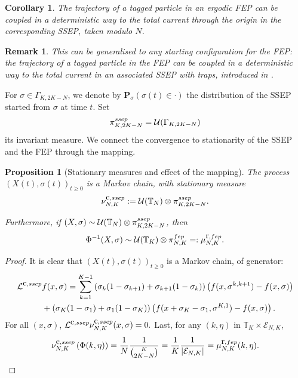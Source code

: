 \documentclass[11pt,a4paper]{article}
\newcommand{\T}{\mathbb{T}}
\newcommand{\bP}{\textbf{P}}
\newcommand{\FEP}{\textsc{fep}}
\newcommand{\SSEP}{\textsc{ssep}}
\newtheorem{proposition}[theorem]{Proposition}
\newtheorem{corollary}[theorem]{Corollary}
\newtheorem{remark}{Remark}[section]
\newcommand{\eqs}[1]{\begin{equation}#1\end{equation}}
\begin{document}
\begin{corollary} \label{cor:mapc}
The trajectory of a tagged particle in an ergodic FEP can be coupled in a deterministic way to the total current through the origin in the corresponding SSEP, taken modulo $N$. 
\end{corollary}

\begin{remark}
This can be generalised to any starting configuration for the FEP: the trajectory of a tagged particle in the FEP can be coupled in a deterministic way to the total current in an associated SSEP with traps, introduced in \cite{erignoux_cutoff_2024}.
\end{remark}

For $\sigma \in \Gamma_{K,2K-N}$, we denote by $\bP_\sigma(\sigma(t) \in \cdot)$ the distribution of the SSEP started from $\sigma$ at time $t$. Set
\eqs{\pi_{K,2K-N}^{\SSEP} = \mathcal{U}(\Gamma_{K, 2K-N})}
its invariant measure. We connect the convergence to stationarity of the SSEP and the FEP through the mapping.
\begin{proposition}[Stationary measures and effect of the mapping] \label{prop:stat_meas_map}
The process $(X(t), \sigma(t))_{t\ge 0}$ is a Markov chain, with stationary measure
\eqs{\nu_{N,K}^{\hbox{\tiny c},\SSEP} := \mathcal{U}(\T_N) \otimes \pi^{\SSEP}_{K,2K-N}.} 

Furthermore, if $(X, \sigma) \sim \mathcal{U}(\T_N) \otimes \pi^{\SSEP}_{K,2K-N}$, then 
\eqs{\Phi^{-1}(X,\sigma) \sim \mathcal{U}(\T_K) \otimes \pi^{\FEP}_{N,K} =: \mu_{N,K}^{\hbox{\tiny r},\FEP}.}
\end{proposition}
\begin{proof}
It is clear that $(X(t), \sigma(t))_{t\ge 0}$ is a Markov chain, of generator:
\begin{align}
\mathcal{L}^{\hbox{\tiny c},\SSEP}&f(x, \sigma) = \sum_{k=1}^{K-1} \left(\sigma_k(1-\sigma_{k+1} )+ \sigma_{k+1}(1-\sigma_k) \right)\left(f(x, \sigma^{k,k+1}) - f(x,\sigma)\right) \nonumber \\
&+ \left(\sigma_K(1-\sigma_{1} )+ \sigma_{1}(1-\sigma_K) \right) \left(f(x + \sigma_{K}-\sigma_{1}, \sigma^{K,1}) - f(x,\sigma)\right).
\end{align}
For all $(x,\sigma)$, $\mathcal{L}^{\hbox{\tiny c},\SSEP} \nu_{N,K}^{\hbox{\tiny c},\SSEP}  (x,\sigma) = 0.$
Last, for any $(k,\eta)$ in $\T_K \times \mathcal{E}_{N,K}$,
\eqs{\nu_{N,K}^{\hbox{\tiny c},\SSEP}\left(\Phi(k,\eta)\right) = \frac{1}{N}\frac{1}{\binom{K}{2K-N}} = \frac{1}{K} \frac{1}{|\mathcal{E}_{N,K}|} = \mu_{N,K}^{\hbox{\tiny r},\FEP}(k,\eta).}

\end{proof}
\end{document}
